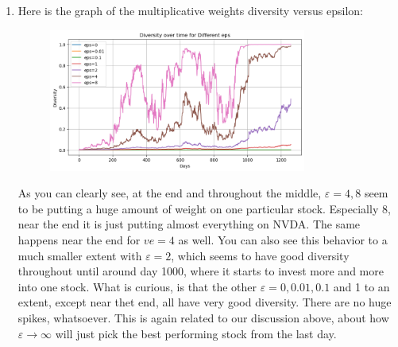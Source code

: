 \documentclass[12pt]{article}
\def\ve{\varepsilon}
\begin{document}
\begin{enumerate}[label=(\alph*)]
        \item Here is the graph of the multiplicative weights diversity versus epsilon:
        \begin{figure}[H]
            \centering
            \includegraphics[width=0.8\textwidth]{diversity_graph.png}
        \end{figure}
        As you can clearly see, at the end and throughout the middle, $\ve = 4,8$ seem to be putting a huge amount of weight on one particular stock. Especially 8, near the end it is just putting almost everything on NVDA. The same happens near the end for $ve = 4$ as well. You can also see this behavior to a much smaller extent with $\ve = 2$, which seems to have good diversity throughout until around day 1000, where it starts to invest more and more into one stock. What is curious, is that the other $\ve = 0, 0.01, 0.1$ and 1 to an extent, except near thet end, all have very good diversity. There are no huge spikes, whatsoever. This is again related to our discussion above, about how $\ve \to \infty$ will just pick the best performing stock from the last day. 


\end{enumerate}
\end{document}
